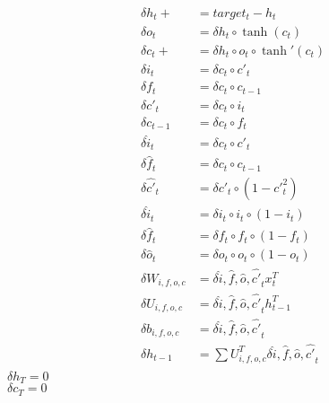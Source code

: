 \documentclass[letterpaper]{article}
\begin{document}
\begin{equation}
\begin{aligned}
\delta h_t +&= target_t - h_t\\
\delta o_t &= \delta h_t \circ \tanh (c_t)\\
\delta c_t +&= \delta h_t \circ o_t \circ \tanh' (c_t)\\
\delta i_t &= \delta c_t \circ c'_t\\
\delta f_t &= \delta c_t \circ c_{t-1}\\
\delta c'_t &= \delta c_t \circ i_t\\
\delta c_{t-1} &= \delta c_t \circ f_t\\
\delta \hat{i}_t &= \delta c_t \circ c'_t\\
\delta \hat{f}_t &= \delta c_t \circ c_{t-1}\\
\delta \hat{c'}_t &= \delta c'_t \circ (1 - c'^2_t)\\
\delta \hat{i}_t &= \delta i_t \circ i_t \circ (1-i_t)\\
\delta \hat{f}_t &= \delta f_t \circ f_t \circ (1-f_t)\\
\delta \hat{o}_t &= \delta o_t \circ o_t \circ (1-o_t)\\
\delta W_{i,f,o,c} &= \delta {\hat{i},\hat{f},\hat{o},\hat{c'}}_t x^T_t\\
\delta U_{i,f,o,c} &= \delta {\hat{i},\hat{f},\hat{o},\hat{c'}}_t h^T_{t-1}\\
\delta b_{i,f,o,c} &= \delta {\hat{i},\hat{f},\hat{o},\hat{c'}}_t\\
\delta h_{t-1} &= \sum U_{i,f,o,c}^T\delta {\hat{i},\hat{f},\hat{o},\hat{c'}}_t\\
\end{aligned}
\end{equation}
$\delta h_{T} = 0$\\
$\delta c_{T} = 0$\\
\end{document}
